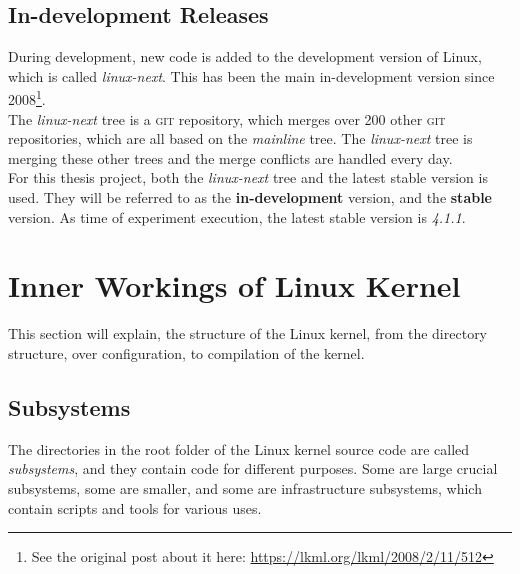 \documentclass[a4paper,11pt]{report}
\newcommand{\f}{\footnote{\fn}}
\newcommand{\figa}{
    \begin{figure}[!htpb]
    \centering
}
\newcommand{\figb}[2]{
    \caption{#1}
    \label{#2}
    \end{figure}
}
\begin{document}
            \subsection*{In-development Releases}

            \def \fn {See the original post about it here: 
            \url{https://lkml.org/lkml/2008/2/11/512}}

During development, new code is added to the development version of Linux, 
which is called \emph{linux-next}. This has been the main in-development version
since 2008\f.
\\

The \emph{linux-next} tree is a \textsc{git} repository, which 
merges over 200 other \textsc{git} repositories\cite
    {nextTrees},
which are all based on the \emph{mainline} tree. The \emph{linux-next} tree is 
merging these other trees and the merge conflicts are handled every day.
\\

For this thesis project, both the \emph{linux-next} tree and the latest stable 
version is used. They will be referred to as the \textbf{in-development} 
version, and the \textbf{stable} version. As time of experiment execution, the 
latest stable version is \emph{4.1.1}.


    \section{Inner Workings of Linux Kernel}

This section will explain, the structure of the Linux kernel, from the 
directory structure, over configuration, to compilation of the kernel.


            \subsection{Subsystems}
            \label{sec:linuxss}

The directories in the root folder of the Linux kernel source code are called 
\emph{subsystems}, and they contain code for different purposes. Some are large 
crucial subsystems, some are smaller, and some are infrastructure 
subsystems, which contain scripts and tools for various uses\cite{42bugs}.
\\
\end{document}
